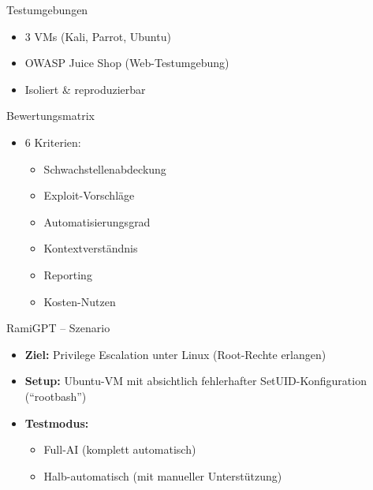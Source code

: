 \documentclass[
	aspectratio=169,	%
	onlytextwidth,		%
	t,					%
	]{beamer}
\begin{document}
\begin{frame}{Testumgebungen}
	\begin{itemize}
		\item 3 VMs (Kali, Parrot, Ubuntu)
		\item OWASP Juice Shop (Web-Testumgebung)
		\item Isoliert \& reproduzierbar
	\end{itemize}
\end{frame}

\begin{frame}{Bewertungsmatrix}
	\begin{itemize}
		\item 6 Kriterien:
		\begin{itemize}
			\item Schwachstellenabdeckung
			\item Exploit-Vorschläge
			\item Automatisierungsgrad
			\item Kontextverständnis
			\item Reporting
			\item Kosten-Nutzen
		\end{itemize}
	\end{itemize}
\end{frame}

\begin{frame}{RamiGPT – Szenario}
	\begin{itemize}
		\item \textbf{Ziel:} Privilege Escalation unter Linux (Root-Rechte erlangen)
		\item \textbf{Setup:} Ubuntu-VM mit absichtlich fehlerhafter SetUID-Konfiguration (\enquote{rootbash})
		\item \textbf{Testmodus:}
		\begin{itemize}
			\item Full-AI (komplett automatisch)
			\item Halb-automatisch (mit manueller Unterstützung)
		\end{itemize}
	\end{itemize}
\end{frame}
\end{document}
